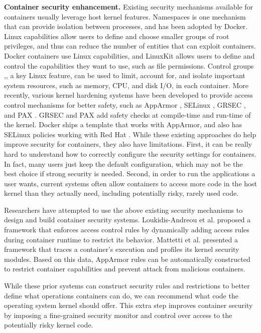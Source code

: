 \textbf{Container security enhancement.} 
Existing security mechanisms available for containers usually leverage host kernel features. 
Namespaces \cite{namespaces} is one mechanism that can provide isolation between processes, and has been adopted by Docker. 
Linux capabilities \cite{linux-kernel-capabilities} allow users to define and choose smaller groups of root privileges, and thus can reduce the number of entities that 
can exploit  containers. Docker containers use Linux capabilities, and LinuxKit allows users to define and control the capabilities they want to use, such as file permissions. 
Control groups \cite{cgroups},, a key Linux feature, can be used to limit, account for, and isolate important system resources, such as memory, CPU, and disk I/O, in each container. 
More recently, various kernel hardening systems have been developed to provide access control mechanisms for better safety, 
such as AppArmor \cite{AppArmor}, SELinux \cite{SELinux}, GRSEC \cite{GRSEC}, and PAX \cite{PAX}. 
GRSEC and PAX add safety checks at compile-time and run-time of the kernel. Docker ships a template that works with AppArmor, and also has SELinux policies working with Red Hat \cite{red-hat}. 
While these existing approaches do help improve security for containers, they also have limitations. 
First, it can be really hard to understand how to correctly configure the security settings for containers. In fact, many users just keep the default configuration, 
which may not be the best choice if strong security is needed. Second, in order to run the applications a user wants, 
current systems often allow containers to access more code in the host kernel than they actually need, including potentially risky, rarely used code. 

Researchers have attempted to use the above existing security mechanisms to design and build container security systems. 
Loukidis-Andreou et al. \cite{8416432} proposed a framework that enforces access control rules by dynamically adding access rules during container runtime to restrict its behavior. 
Mattetti et al. \cite{7346869} presented a framework that traces a container’s execution and profiles its kernel security modules. 
Based on this data, AppArmor rules can be automatically constructed to restrict container capabilities and prevent attack from malicious containers. 

While these prior systems can construct security rules and restrictions to better define what operations containers can do, 
we can recommend what code the operating system kernel should offer. 
This extra step improves container security by imposing a fine-grained security monitor and control over access to the potentially risky kernel code. 
